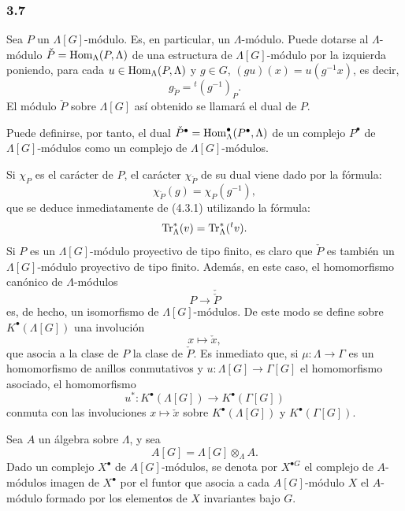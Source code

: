 \subsubsection*{3.7}

Sea $P$ un $\Lambda[G]$-módulo. Es, en particular, un $\Lambda$-módulo. Puede dotarse al $\Lambda$-módulo $\check P=\operatorname{Hom}_\Lambda(P,\Lambda)$ de una estructura de $\Lambda[G]$-módulo por la izquierda poniendo, para cada $u\in\operatorname{Hom}_\Lambda(P,\Lambda)$ y $g\in G$, $(gu)(x)=u(g^{-1}x)$, es decir,
\[
g_{\check P}={}^{t}(g^{-1})_P.
\tag{3.7.1}
\]
El módulo $\check P$ sobre $\Lambda[G]$ así obtenido se llamará el dual de $P$.

Puede definirse, por tanto, el dual $\check P^\bullet=\operatorname{Hom}_\Lambda^\bullet(P^\bullet,\Lambda)$ de un complejo $P^\bullet$ de $\Lambda[G]$-módulos como un complejo de $\Lambda[G]$-módulos.

Si $\chi_P$ es el carácter de $P$, el carácter $\chi_{\check P}$ de su dual viene dado por la fórmula:
\[
\chi_{\check P}(g)=\chi_P(g^{-1}),
\tag{3.7.2}
\]
que se deduce inmediatamente de (4.3.1) utilizando la fórmula:
\[
\operatorname{Tr}_\Lambda^*(v)=\operatorname{Tr}_\Lambda^*({}^{t}v).
\]
Si $P$ es un $\Lambda[G]$-módulo proyectivo de tipo finito, es claro que $\check P$ es también un $\Lambda[G]$-módulo proyectivo de tipo finito. Además, en este caso, el homomorfismo canónico de $\Lambda$-módulos
\[
P\longrightarrow\check{\check P}
\]
es, de hecho, un isomorfismo de $\Lambda[G]$-módulos. De este modo se define sobre $K^{\bullet}(\Lambda[G])$ una involución
\[
x\longmapsto \check x,
\]
que asocia a la clase de $P$ la clase de $\check P$. Es inmediato que, si $\mu:\Lambda\to\Gamma$ es un homomorfismo de anillos conmutativos y $u:\Lambda[G]\to\Gamma[G]$ el homomorfismo asociado, el homomorfismo
\[
u^*:K^{\bullet}(\Lambda[G])\longrightarrow K^{\bullet}(\Gamma[G])
\]
conmuta con las involuciones $x\longmapsto \check x$ sobre $K^{\bullet}(\Lambda[G])$ y $K^{\bullet}(\Gamma[G])$.

Sea $A$ un álgebra sobre $\Lambda$, y sea
\[
A[G]=\Lambda[G]\otimes_\Lambda A.
\]
Dado un complejo $X^\bullet$ de $A[G]$-módulos, se denota por $X^{\bullet G}$ el complejo de $A$-módulos imagen de $X^\bullet$ por el funtor que asocia a cada $A[G]$-módulo $X$ el $A$-módulo formado por los elementos de $X$ invariantes bajo $G$.
